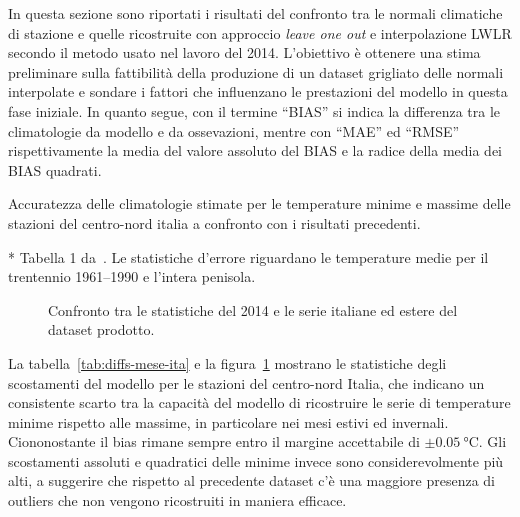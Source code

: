 In questa sezione sono riportati i risultati del confronto tra le normali climatiche di stazione e quelle ricostruite con approccio \emph{leave one out} e interpolazione LWLR secondo il metodo usato nel lavoro del 2014. L'obiettivo è ottenere una stima preliminare sulla fattibilità della produzione di un dataset grigliato delle normali interpolate e sondare i fattori che influenzano le prestazioni del modello in questa fase iniziale. In quanto segue, con il termine ``BIAS'' si indica la differenza tra le climatologie da modello e da ossevazioni, mentre con ``MAE'' ed ``RMSE'' rispettivamente la media del valore assoluto del BIAS e la radice della media dei BIAS quadrati.

\begin{table}[ht]
  \centering
  \begin{adjustbox}{max width=\textwidth}
    \begin{threeparttable}
      \caption{Accuratezza delle climatologie stimate per le temperature minime e massime delle stazioni del centro-nord italia a confronto con i risultati precedenti.}\label{tab:diffs-mese-ita}
      
      \begin{tablenotes}
      \item[*] Tabella 1 da~\cite[p.~10]{brunettiHighresolutionTemperatureClimatology2014}. Le statistiche d'errore riguardano le temperature medie per il trentennio 1961--1990 e l'intera penisola.
      \end{tablenotes}
    \end{threeparttable}
  \end{adjustbox}
\end{table}

\begin{figure}[ht]
  \centering
  
  \caption{Confronto tra le statistiche del 2014 e le serie italiane ed estere del dataset prodotto.}\label{fig:diffs-mese-ita}
\end{figure}
La tabella~\ref{tab:diffs-mese-ita} e la figura~\ref{fig:diffs-mese-ita} mostrano le statistiche degli scostamenti del modello per le stazioni del centro-nord Italia, che indicano un consistente scarto tra la capacità del modello di ricostruire le serie di temperature minime rispetto alle massime, in particolare nei mesi estivi ed invernali. Ciononostante il bias rimane sempre entro il margine accettabile di \(\pm\qty{0.05}{\degreeCelsius}\). Gli scostamenti assoluti e quadratici delle minime invece sono considerevolmente più alti, a suggerire che rispetto al precedente dataset c'è una maggiore presenza di outliers che non vengono ricostruiti in maniera efficace.


